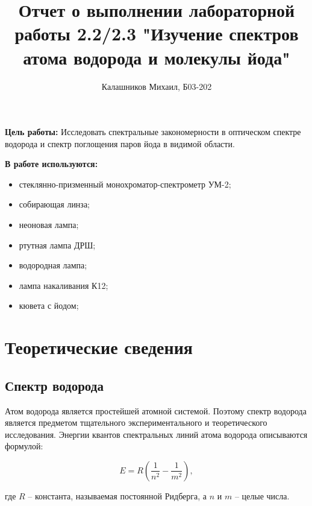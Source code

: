 \documentclass[14pt, a4paper]{report}
\title{\textbf{Отчет о выполнении лабораторной работы 2.2/2.3 "Изучение спектров атома водорода и молекулы йода"}}
\author{Калашников Михаил, Б03-202}
\date{}
\begin{document}
\maketitle

\textbf{Цель работы:}
Исследовать спектральные закономерности в оптическом спектре водорода и спектр поглощения паров йода в видимой области.
\newline


\textbf{В работе используются:}
\begin{itemize}
\item стеклянно-призменный монохроматор-спектрометр УМ-2;
\item собирающая линза;
\item неоновая лампа;
\item ртутная лампа ДРШ;    
\item водородная лампа;
\item лампа накаливания К12;
\item кювета с йодом;
\end{itemize}

\section{Теоретические сведения}

\subsection{Спектр водорода}

Атом водорода является простейшей атомной системой. Поэтому спектр водорода является предметом тщательного экспериментального и теоретического исследования. Энергии квантов спектральных линий атома водорода описываются формулой:

\[E=R(\frac{1}{n^2}-\frac{1}{m^2}),\]

где $R$ -- константа, называемая постоянной Ридберга, а $n$ и $m$ -- целые числа.
\end{document}
